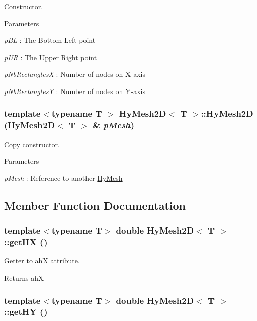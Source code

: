 Constructor. 


\begin{DoxyParams}{Parameters}
\item[{\em pBL}]: The Bottom Left point \item[{\em pUR}]: The Upper Right point \item[{\em pNbRectanglesX}]: Number of nodes on X-\/axis \item[{\em pNbRectanglesY}]: Number of nodes on Y-\/axis \end{DoxyParams}
\hypertarget{classHyMesh2D_addcbe5c16210083bf69b1210ea11d569}{
\subsubsection[{HyMesh2D}]{\setlength{\rightskip}{0pt plus 5cm}template$<$typename T $>$ {\bf HyMesh2D}$<$ T $>$::{\bf HyMesh2D} ({\bf HyMesh2D}$<$ T $>$ \& {\em pMesh})}}
\label{classHyMesh2D_addcbe5c16210083bf69b1210ea11d569}


Copy constructor. 


\begin{DoxyParams}{Parameters}
\item[{\em pMesh}]: Reference to another \hyperlink{classHyMesh}{HyMesh} \end{DoxyParams}


\subsection{Member Function Documentation}
\hypertarget{classHyMesh2D_aa3c7f4d72c521783c2b358b6f7b73031}{
\subsubsection[{getHX}]{\setlength{\rightskip}{0pt plus 5cm}template$<$typename T$>$ double {\bf HyMesh2D}$<$ T $>$::getHX ()}}
\label{classHyMesh2D_aa3c7f4d72c521783c2b358b6f7b73031}


Getter to ahX attribute. 

\begin{DoxyReturn}{Returns}
ahX 
\end{DoxyReturn}
\hypertarget{classHyMesh2D_a94d54a398cb5d0de0b083b03926d698e}{
\subsubsection[{getHY}]{\setlength{\rightskip}{0pt plus 5cm}template$<$typename T$>$ double {\bf HyMesh2D}$<$ T $>$::getHY ()}}
\label{classHyMesh2D_a94d54a398cb5d0de0b083b03926d698e}


